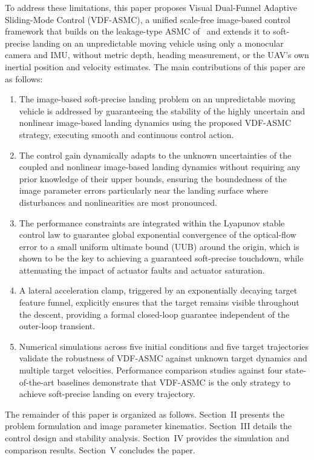 \documentclass{IEEEtaes}
\begin{document}
To address these limitations, this paper proposes Visual Dual-Funnel Adaptive Sliding-Mode Control (VDF-ASMC), a unified scale-free image-based control framework that builds on the leakage-type ASMC of~\cite{singhal2025} and extends it to soft-precise landing on an unpredictable moving vehicle using only a monocular camera and IMU, without metric depth, heading measurement, or the UAV's own inertial position and velocity estimates. The main contributions of this paper are as follows:
\begin{enumerate}
\item The image-based soft-precise landing problem on an unpredictable moving vehicle is addressed by guaranteeing the stability of the highly uncertain and nonlinear image-based landing dynamics using the proposed VDF-ASMC strategy, executing smooth and continuous control action.
\item The control gain dynamically adapts to the unknown uncertainties of the coupled and nonlinear image-based landing dynamics without requiring any prior knowledge of their upper bounds, ensuring the boundedness of the image parameter errors particularly near the landing surface where disturbances and nonlinearities are most pronounced.
\item The performance constraints are integrated within the Lyapunov stable control law to guarantee global exponential convergence of the optical-flow error to a small uniform ultimate bound (UUB) around the origin, which is shown to be the key to achieving a guaranteed soft-precise touchdown, while attenuating the impact of actuator faults and actuator saturation.
\item A lateral acceleration clamp, triggered by an exponentially decaying target feature funnel, explicitly ensures that the target remains visible throughout the descent, providing a formal closed-loop guarantee independent of the outer-loop transient.
\item Numerical simulations across five initial conditions and five target trajectories validate the robustness of VDF-ASMC against unknown target dynamics and multiple target velocities. Performance comparison studies against four state-of-the-art baselines demonstrate that VDF-ASMC is the only strategy to achieve soft-precise landing on every trajectory.
\end{enumerate}
The remainder of this paper is organized as follows. Section~II presents the problem formulation and image parameter kinematics. Section~III details the control design and stability analysis. Section~IV provides the simulation and comparison results. Section~V concludes the paper.
\end{document}
